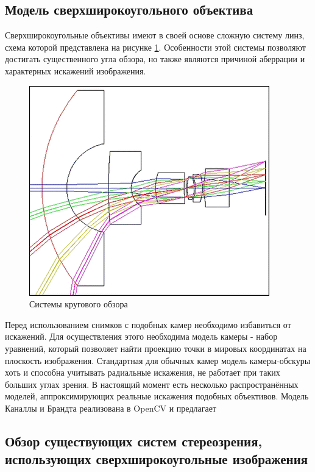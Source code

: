 \subsection{Модель сверхширокоугольного объектива}

Сверхширокоугольные объективы имеют в своей основе сложную систему линз, схема которой представлена на рисунке \ref{pic:fyscheme}. 
Особенности этой системы позволяют достигать существенного угла обзора, но также являются причиной аберрации и характерных искажений 
изображения. 

\begin{figure}[H]
    \begin{center}
        \includegraphics[scale=0.5]{pics/fisheye_scheme.png}                                                                                            %
        \caption{Системы кругового обзора}
        \label{pic:fyscheme}
    \end{center}
\end{figure}
    
Перед использованием снимков с подобных камер необходимо избавиться от искажений. Для осуществления этого необходима модель камеры - 
набор уравнений, который позволяет найти проекцию точки в мировых координатах на плоскость изображения. Стандартная для обычных камер 
модель камеры-обскуры хоть и способна учитывать радиальные искажения, не работает при таких больших углах зрения. В настоящий момент 
есть несколько распространённых моделей, аппроксимирующих реальные искажения подобных объективов. Модель Каналлы и Брандта \cite{opencv_model} 
реализована в OpenCV и предлагает 


\subsection{Обзор существующих систем стереозрения, использующих сверхширокоугольные изображения}

